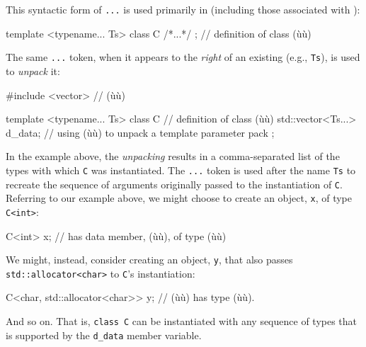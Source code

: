 This syntactic form of \lstinline!...! is used primarily in
 (including those associated with
):

\begin{emcppslisting}
template <typename... Ts>
class C { /*...*/ };  // definition of class (ù{}ù)
\end{emcppslisting}
    

\noindent The same \lstinline!...! token, when it appears to the \emph{right} of an
existing  (e.g., \lstinline!Ts!), is used
to \emph{unpack} it:

\begin{emcppslisting}[emcppsbatch=e6]
#include <vector>  // (ù{}ù)

template <typename... Ts> class C  // definition of class (ù{}ù)
{
    std::vector<Ts...> d_data;
        // using (ù{}ù) to unpack a template parameter pack
};
\end{emcppslisting}
    

\noindent In the example above, the \emph{unpacking} results in a comma-separated
list of the types with which \lstinline!C! was instantiated. The
\lstinline!...! token is used after the 
name \lstinline!Ts! to recreate the sequence of arguments originally passed
to the instantiation of \lstinline!C!. Referring to our example above, we
might choose to create an object, \lstinline!x!, of type \lstinline!C<int>!:

\begin{emcppslisting}[emcppsbatch=e6]
C<int> x;  // has data member, (ù{}ù), of type (ù{}ù)
\end{emcppslisting}
    

\noindent We might, instead, consider creating an object, \lstinline!y!, that also
passes \lstinline!std::allocator<char>! to \lstinline!C!'s instantiation:

\begin{emcppslisting}[emcppsbatch=e6]
C<char, std::allocator<char>> y;
    // (ù{}ù) has type (ù{}ù).
\end{emcppslisting}
    

\noindent And so on. That is, \lstinline!class!~\lstinline!C! can be instantiated with
any sequence of types that is supported by the \lstinline!d_data! member
variable.

